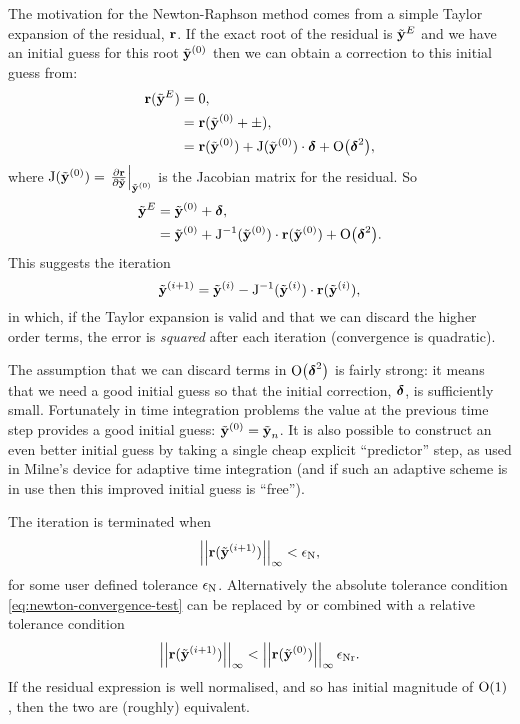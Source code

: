 The motivation for the Newton-Raphson method comes from a simple Taylor expansion of the residual, $\boldsymbol{\mathrm{r}}$.
If the exact root of the residual is $\tilde{\boldsymbol{\mathrm{y}}}^E$ and we have an initial guess for this root ${\tilde{\boldsymbol{\mathrm{y}}}}^{(0)}$ then we can obtain a correction to this initial guess from:
\begin{equation}
  \begin{aligned}
    \boldsymbol{\mathrm{r}}(\tilde{\boldsymbol{\mathrm{y}}}^E) &= 0, \\
    &= \boldsymbol{\mathrm{r}}({\tilde{\boldsymbol{\mathrm{y}}}}^{(0)} + \pm), \\
    &= \boldsymbol{\mathrm{r}}({\tilde{\boldsymbol{\mathrm{y}}}}^{(0)}) + \mathrm{J}({\tilde{\boldsymbol{\mathrm{y}}}}^{(0)}) \cdot \boldsymbol{\mathrm{\delta}} + \mathrm{O}{\left( \boldsymbol{\mathrm{\delta}}^2 \right)},
  \end{aligned}
\end{equation}
where $\mathrm{J}({\tilde{\boldsymbol{\mathrm{y}}}}^{(0)}) = {\left. {\frac{\partial \boldsymbol{\mathrm{r}}}{\partial \tilde{\boldsymbol{\mathrm{y}}}}} \right|_{{\tilde{\boldsymbol{\mathrm{y}}}}^{(0)}}}$ is the Jacobian matrix for the residual.
So
\begin{equation}
  \begin{aligned}
    \label{eq:49}
    \tilde{\boldsymbol{\mathrm{y}}}^E &= {\tilde{\boldsymbol{\mathrm{y}}}}^{(0)} + \boldsymbol{\mathrm{\delta}}, \\
    &= {\tilde{\boldsymbol{\mathrm{y}}}}^{(0)} + \mathrm{J}^{-1}({\tilde{\boldsymbol{\mathrm{y}}}}^{(0)}) \cdot \boldsymbol{\mathrm{r}}({\tilde{\boldsymbol{\mathrm{y}}}}^{(0)}) + \mathrm{O}{\left( \boldsymbol{\mathrm{\delta}}^2 \right)}.
  \end{aligned}
\end{equation}
This suggests the iteration
\begin{equation}
  {\tilde{\boldsymbol{\mathrm{y}}}}^{(i+1)} = {\tilde{\boldsymbol{\mathrm{y}}}}^{(i)} - \mathrm{J}^{-1}({\tilde{\boldsymbol{\mathrm{y}}}}^{(i)}) \cdot \boldsymbol{\mathrm{r}}({\tilde{\boldsymbol{\mathrm{y}}}}^{(i)}),
\end{equation}
in which, if the Taylor expansion is valid and that we can discard the higher order terms, the error is \emph{squared} after each iteration (\ie convergence is quadratic).

The assumption that we can discard terms in $\mathrm{O}{\left( \boldsymbol{\mathrm{\delta}}^2 \right)}$ is fairly strong: it means that we need a good initial guess so that the initial correction, $\boldsymbol{\mathrm{\delta}}$, is sufficiently small.
Fortunately in time integration problems the value at the previous time step provides a good initial guess: ${\tilde{\boldsymbol{\mathrm{y}}}}^{(0)} = \tilde{\boldsymbol{\mathrm{y}}}_n$.
It is also possible to construct an even better initial guess by taking a single cheap explicit ``predictor'' step, as used in Milne's device for adaptive time integration (and if such an adaptive scheme is in use then this improved initial guess is ``free'').

The iteration is terminated when
\begin{equation}
  \left| \left| \boldsymbol{\mathrm{r}}({\tilde{\boldsymbol{\mathrm{y}}}}^{(i+1)}) \right| \right|_{\infty} < \epsilon_{\mathrm{N}},
\label{eq:newton-convergence-test}
\end{equation}
for some user defined tolerance $\epsilon_{\mathrm{N}}$.
Alternatively the absolute tolerance condition \cref{eq:newton-convergence-test} can be replaced by or combined with a relative tolerance condition
\begin{equation}
  \left| \left| \boldsymbol{\mathrm{r}}({\tilde{\boldsymbol{\mathrm{y}}}}^{(i+1)}) \right| \right|_{\infty} < \left| \left| \boldsymbol{\mathrm{r}}({\tilde{\boldsymbol{\mathrm{y}}}}^{(0)}) \right| \right|_{\infty} \epsilon_{\mathrm{Nr}}.
\end{equation}
If the residual expression is well normalised, and so has initial magnitude of $\mathrm{O}{\left( 1 \right)}$, then the two are (roughly) equivalent.

